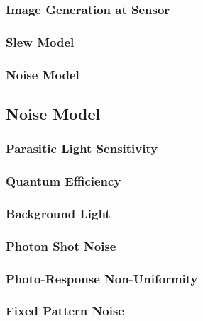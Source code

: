 \subsubsection{Image Generation at Sensor} %
\blindtext

\subsubsection{Slew Model} %
\blindtext

\subsubsection{Noise Model}
\blindtext




\subsection{Noise Model}
\blindtext

\subsubsection{Parasitic Light Sensitivity} %
\blindtext

\subsubsection{Quantum Efficiency} %
\blindtext

\subsubsection{Background Light} %
\blindtext

\subsubsection{Photon Shot Noise} %
\blindtext

\subsubsection{Photo-Response Non-Uniformity} %
\blindtext

\subsubsection{Fixed Pattern Noise} %
\blindtext

